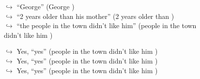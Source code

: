 \documentclass[11pt,a4paper, onecolumn]{article}
\begin{document}
\begin{figure}[t]
\begin{tcolorbox}[boxsep=0pt,left=5pt,right=0pt,top=2pt,colback = yellow!5]
\begin{dialogue}
\colorbox{pink!25}{$\hookrightarrow$}
{ ``George'' (George ) }
\\
\colorbox{pink!25}{$\hookrightarrow$}
{ ``2 years older than his mother'' (2 years older than ) }
\\
\colorbox{pink!25}{$\hookrightarrow$}
{ ``the people in the town didn't like him'' (people in the town didn't like him ) }
\\
 \end{dialogue}\end{tcolorbox}\end{figure}\begin{figure}[t] \small \begin{tcolorbox}[boxsep=0pt,left=5pt,right=0pt,top=2pt,colback = yellow!5] \begin{dialogue}
 \small 
\colorbox{pink!25}{$\hookrightarrow$}
\colorbox{red!25}{Yes,}
{ ``yes'' (people in the town didn't like him ) }
\\
\colorbox{pink!25}{$\hookrightarrow$}
\colorbox{red!25}{Yes,}
{ ``yes'' (people in the town didn't like him ) }
\\
\colorbox{pink!25}{$\hookrightarrow$}
\colorbox{red!25}{Yes,}
{ ``yes'' (people in the town didn't like him ) }
\\
 \end{dialogue}\end{tcolorbox}\end{figure}
\end{document}
